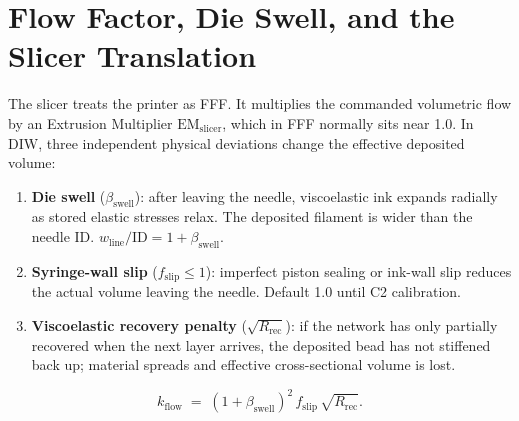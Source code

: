 \documentclass[11pt,a4paper]{article}
\begin{document}
\section{Flow Factor, Die Swell, and the Slicer Translation}
\label{sec:flow_factor}

The slicer treats the printer as FFF. It multiplies the commanded
volumetric flow by an Extrusion Multiplier $\mathrm{EM}_\mathrm{slicer}$,
which in FFF normally sits near 1.0. In DIW, three independent physical
deviations change the effective deposited volume:

\begin{enumerate}[leftmargin=1.6em,itemsep=2pt]
\item \textbf{Die swell} ($\beta_\mathrm{swell}$): after leaving the
needle, viscoelastic ink expands radially as stored elastic stresses
relax. The deposited filament is wider than the needle ID.
$w_\mathrm{line}/\mathrm{ID}=1+\beta_\mathrm{swell}$.
\item \textbf{Syringe-wall slip} ($f_\mathrm{slip}\leq 1$): imperfect
piston sealing or ink-wall slip reduces the actual volume leaving the
needle. Default 1.0 until C2 calibration.
\item \textbf{Viscoelastic recovery penalty} ($\sqrt{R_\mathrm{rec}}$):
if the network has only partially recovered when the next layer arrives,
the deposited bead has not stiffened back up; material spreads and
effective cross-sectional volume is lost.
\end{enumerate}

\begin{equation}
k_\mathrm{flow}
\;=\; (1+\beta_\mathrm{swell})^{2}\,f_\mathrm{slip}\,\sqrt{R_\mathrm{rec}}.
\label{eq:kflow}
\end{equation}
\end{document}
